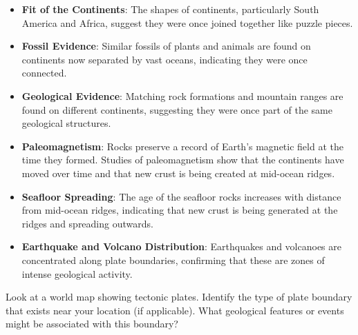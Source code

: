 \begin{itemize}
    \item \textbf{Fit of the Continents}: The shapes of continents, particularly South America and Africa, suggest they were once joined together like puzzle pieces.
    \item \textbf{Fossil Evidence}:  Similar fossils of plants and animals are found on continents now separated by vast oceans, indicating they were once connected.
    \item \textbf{Geological Evidence}:  Matching rock formations and mountain ranges are found on different continents, suggesting they were once part of the same geological structures.
    \item \textbf{Paleomagnetism}:  Rocks preserve a record of Earth's magnetic field at the time they formed.  Studies of paleomagnetism show that the continents have moved over time and that new crust is being created at mid-ocean ridges.
    \item \textbf{Seafloor Spreading}:  The age of the seafloor rocks increases with distance from mid-ocean ridges, indicating that new crust is being generated at the ridges and spreading outwards.
    \item \textbf{Earthquake and Volcano Distribution}:  Earthquakes and volcanoes are concentrated along plate boundaries, confirming that these are zones of intense geological activity.
\end{itemize}

\begin{stopandthink}
Look at a world map showing tectonic plates.  Identify the type of plate boundary that exists near your location (if applicable).  What geological features or events might be associated with this boundary?
\end{stopandthink}

